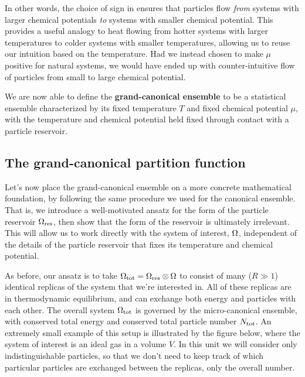 In other words, the choice of sign in  ensures that particles flow \textit{from} systems with larger chemical potentials \textit{to} systems with smaller chemical potential.
This provides a useful analogy to heat flowing from hotter systems with larger temperatures to colder systems with smaller temperatures, allowing us to reuse our intuition based on the temperature.
Had we instead chosen to make $\mu$ positive for natural systems, we would have ended up with counter-intuitive flow of particles from small to large chemical potential.

\begin{shaded}
  We are now able to define the \textbf{grand-canonical ensemble} to be a statistical ensemble characterized by its fixed temperature $T$ and fixed chemical potential $\mu$, with the temperature and chemical potential held fixed through contact with a particle reservoir.
\end{shaded}



\subsection{\label{sec:Zg}The grand-canonical partition function}
Let's now place the grand-canonical ensemble on a more concrete mathematical foundation, by following the same procedure we used for the canonical ensemble.
That is, we introduce a well-motivated ansatz for the form of the particle reservoir $\Omega_{\text{res}}$, then show that the form of the reservoir is ultimately irrelevant.
This will allow us to work directly with the system of interest, $\Omega$, independent of the details of the particle reservoir that fixes its temperature and chemical potential.

As before, our ansatz is to take $\Omega_{\text{tot}} = \Omega_{\text{res}} \otimes \Omega$ to consist of many ($R \gg 1$) identical replicas of the system \Om that we're interested in.
All of these replicas are in thermodynamic equilibrium, and can exchange both energy and particles with each other.
The overall system $\Omega_{\text{tot}}$ is governed by the micro-canonical ensemble, with conserved total energy \Etot and conserved total particle number $N_{\text{tot}}$.
An extremely small example of this setup is illustrated by the figure below, where the system of interest is an ideal gas in a volume $V$.
In this unit we will consider only indistinguishable particles, so that we don't need to keep track of which particular particles are exchanged between the replicas, only the overall number. %

